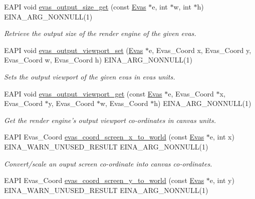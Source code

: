 \begin{DoxyCompactItemize}
EAPI void \hyperlink{group__Evas__Output__Size_ga1f3497644d526ff5ded49b19c1ec732a}{evas\_\-output\_\-size\_\-get} (const \hyperlink{group__Evas__Canvas_ga5ff87cc4ce6bc43e3b640a6d37f73043}{Evas} $\ast$e, int $\ast$w, int $\ast$h) EINA\_\-ARG\_\-NONNULL(1)
\begin{DoxyCompactList}\small\item\em Retrieve the output size of the render engine of the given evas. \item\end{DoxyCompactList}\item 
EAPI void \hyperlink{group__Evas__Output__Size_ga1d39edcaff429d884d4a70aa1fca0c08}{evas\_\-output\_\-viewport\_\-set} (\hyperlink{group__Evas__Canvas_ga5ff87cc4ce6bc43e3b640a6d37f73043}{Evas} $\ast$e, Evas\_\-Coord x, Evas\_\-Coord y, Evas\_\-Coord w, Evas\_\-Coord h) EINA\_\-ARG\_\-NONNULL(1)
\begin{DoxyCompactList}\small\item\em Sets the output viewport of the given evas in evas units. \item\end{DoxyCompactList}\item 
EAPI void \hyperlink{group__Evas__Output__Size_gab94e38ef64004f0ead8cd8f7a8f69fee}{evas\_\-output\_\-viewport\_\-get} (const \hyperlink{group__Evas__Canvas_ga5ff87cc4ce6bc43e3b640a6d37f73043}{Evas} $\ast$e, Evas\_\-Coord $\ast$x, Evas\_\-Coord $\ast$y, Evas\_\-Coord $\ast$w, Evas\_\-Coord $\ast$h) EINA\_\-ARG\_\-NONNULL(1)
\begin{DoxyCompactList}\small\item\em Get the render engine's output viewport co-\/ordinates in canvas units. \item\end{DoxyCompactList}\item 
EAPI Evas\_\-Coord \hyperlink{group__Evas__Coord__Mapping__Group_gab435c4e98554a4c6b934840a38d96051}{evas\_\-coord\_\-screen\_\-x\_\-to\_\-world} (const \hyperlink{group__Evas__Canvas_ga5ff87cc4ce6bc43e3b640a6d37f73043}{Evas} $\ast$e, int x) EINA\_\-WARN\_\-UNUSED\_\-RESULT EINA\_\-ARG\_\-NONNULL(1)
\begin{DoxyCompactList}\small\item\em Convert/scale an ouput screen co-\/ordinate into canvas co-\/ordinates. \item\end{DoxyCompactList}\item 
EAPI Evas\_\-Coord \hyperlink{group__Evas__Coord__Mapping__Group_gac69db230ec0bd06f683e62665abe5df2}{evas\_\-coord\_\-screen\_\-y\_\-to\_\-world} (const \hyperlink{group__Evas__Canvas_ga5ff87cc4ce6bc43e3b640a6d37f73043}{Evas} $\ast$e, int y) EINA\_\-WARN\_\-UNUSED\_\-RESULT EINA\_\-ARG\_\-NONNULL(1)

\end{DoxyCompactItemize}
